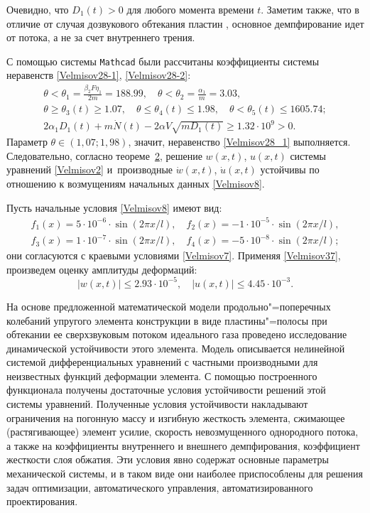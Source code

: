 Очевидно, что $D_1(t)>0$ для любого момента времени $t$. 
Заметим также, что в отличие от случая дозвукового обтекания пластин   \cite{Ankilov2, Ankilov3, Ankilov4}, основное демпфирование идет от потока, а не за счет внутреннего трения. 

С помощью системы {\tt Mathcad} были рассчитаны коэффициенты системы неравенств  \eqref{Velmisov28-1}, \eqref{Velmisov28-2}:
\begin{gather*}
\theta < \theta_1=\frac{\displaystyle\beta _{2} F\eta _{1}}{\displaystyle 2m}=188.99, \quad  
\theta < \theta_2=\frac{\displaystyle \alpha_1 }{\displaystyle m}=3.03,
\\
\theta \ge \theta_3(t)\ge 1.07, \quad
\theta \le \theta_4(t)\le 1.98, \quad 
\theta <\theta_5(t)\le 1605.74;\\
2\alpha_1 D_1(t)+m\dot{N}(t)-2\alpha V\sqrt{mD_1(t)}\ge 1.32\cdot 10^{9}>0.
\end{gather*} 
Параметр $\theta\in (1,07;1,98)$, значит, неравенство \eqref{Velmisov28_1} выполняется. 
Следовательно, согласно теореме~\hyperlink{Velm:th2}{2},  решение $w(x,t)$, $u(x,t)$ системы уравнений \eqref{Velmisov2} и~производные $\dot{w}(x,t)$, $\dot{u}(x,t)$ устойчивы по отношению к возмущениям начальных данных \eqref{Velmisov8}.

Пусть начальные условия \eqref{Velmisov8} имеют вид:
\begin{gather*}
f_{1} (x)= 5\cdot 10^{-6} \cdot \sin({2\pi x}/{l}),\quad 
f_{2} (x)=-1\cdot 10^{-5} \cdot \sin({2\pi x}/{l}), 
\\  
f_{3} (x)= 1\cdot 10^{-7} \cdot \sin({2\pi x}/{l}),\quad 
f_{4} (x)=-5\cdot 10^{-8} \cdot \sin({2\pi x}/{l});
\end{gather*}
они согласуются с краевыми условиями \eqref{Velmisov7}. 
Применяя \eqref{Velmisov37},  произведем оценку амплитуды деформаций:
$$
|w(x,t)|\le 2.93\cdot 10^{-5},
\quad  
|u(x,t)|\le 4.45\cdot 10^{-3}.
$$

\smallskip

На основе предложенной математической модели продоль\-но"=поперечных колебаний упругого элемента конструкции в виде пласти\-ны"=полосы при обтекании ее сверхзвуковым потоком идеального газа проведено исследование динамической устойчивости этого элемента. Модель описывается нелинейной системой дифференциальных уравнений с частными производными для неизвестных функций деформации элемента. С помощью построенного функционала получены достаточные условия устойчивости решений этой системы уравнений. Полученные условия устойчивости накладывают ограничения на погонную массу и изгибную жесткость элемента, сжимающее (растягивающее) элемент усилие, скорость невозмущенного однородного потока, а также на коэффициенты внутреннего и внешнего демпфирования, коэффициент жесткости слоя обжатия.  Эти условия явно содержат основные параметры механической системы, и в таком виде они наиболее приспособлены для решения задач оптимизации, автоматического управления, автоматизированного проектирования. 

